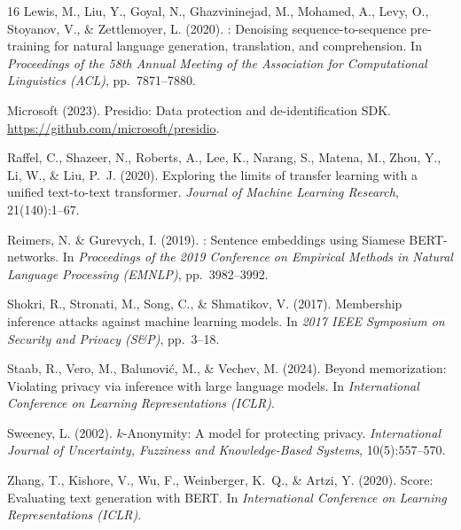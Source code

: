 \documentclass[10pt,twocolumn]{article}
\begin{document}
\begin{thebibliography}{16}
Lewis, M., Liu, Y., Goyal, N., Ghazvininejad, M., Mohamed, A., Levy, O., Stoyanov, V., \& Zettlemoyer, L. (2020).
: Denoising sequence-to-sequence pre-training for natural language generation, translation, and comprehension.
\newblock In \emph{Proceedings of the 58th Annual Meeting of the Association for Computational Linguistics (ACL)}, pp.\ 7871--7880.

Microsoft (2023).
\newblock Presidio: Data protection and de-identification {SDK}.
\newblock \url{https://github.com/microsoft/presidio}.

Raffel, C., Shazeer, N., Roberts, A., Lee, K., Narang, S., Matena, M., Zhou, Y., Li, W., \& Liu, P.~J. (2020).
\newblock Exploring the limits of transfer learning with a unified text-to-text transformer.
\newblock \emph{Journal of Machine Learning Research}, 21(140):1--67.

Reimers, N. \& Gurevych, I. (2019).
: Sentence embeddings using {S}iamese {BERT}-networks.
\newblock In \emph{Proceedings of the 2019 Conference on Empirical Methods in Natural Language Processing (EMNLP)}, pp.\ 3982--3992.

Shokri, R., Stronati, M., Song, C., \& Shmatikov, V. (2017).
\newblock Membership inference attacks against machine learning models.
\newblock In \emph{2017 IEEE Symposium on Security and Privacy (S\&P)}, pp.\ 3--18.

Staab, R., Vero, M., Balunovi{\'c}, M., \& Vechev, M. (2024).
\newblock Beyond memorization: Violating privacy via inference with large language models.
\newblock In \emph{International Conference on Learning Representations (ICLR)}.

Sweeney, L. (2002).
\newblock $k$-Anonymity: A model for protecting privacy.
\newblock \emph{International Journal of Uncertainty, Fuzziness and Knowledge-Based Systems}, 10(5):557--570.

Zhang, T., Kishore, V., Wu, F., Weinberger, K.~Q., \& Artzi, Y. (2020).
Score: Evaluating text generation with {BERT}.
\newblock In \emph{International Conference on Learning Representations (ICLR)}.

\end{thebibliography}
\end{document}
